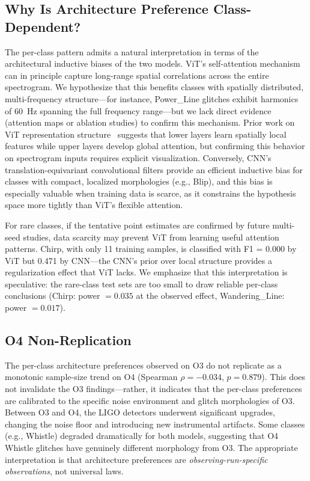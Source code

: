 \documentclass[12pt]{article}
\newcommand{\spearmanRhoOfour}{-0.034}
\newcommand{\spearmanPOfour}{0.879}
\begin{document}
\subsection{Why Is Architecture Preference Class-Dependent?}

The per-class pattern admits a natural interpretation in terms of the
architectural inductive biases of the two models.
ViT's self-attention mechanism can in principle capture long-range spatial
correlations across the entire spectrogram. We hypothesize that this benefits
classes with spatially distributed, multi-frequency structure---for instance,
Power\_Line glitches exhibit harmonics of 60~Hz spanning the full frequency
range---but we lack direct evidence (attention maps or ablation studies) to
confirm this mechanism.
Prior work on ViT representation structure~\citep{Raghu2021} suggests that
lower layers learn spatially local features while upper layers develop global
attention, but confirming this behavior on spectrogram inputs requires
explicit visualization.
Conversely, CNN's translation-equivariant convolutional filters provide an
efficient inductive bias for classes with compact, localized morphologies
(e.g., Blip), and this bias is especially valuable when training data is
scarce, as it constrains the hypothesis space more tightly than
ViT's flexible attention.

For rare classes, if the tentative point estimates are confirmed by future multi-seed studies, data scarcity may prevent ViT from learning useful attention patterns.
Chirp, with only 11 training samples, is classified with F1 = 0.000 by ViT
but 0.471 by CNN---the CNN's prior over local structure provides a
regularization effect that ViT lacks.
We emphasize that this interpretation is speculative: the rare-class test sets
are too small to draw reliable per-class conclusions
(Chirp: power $= 0.035$ at the observed effect,
Wandering\_Line: power $= 0.017$).

\subsection{O4 Non-Replication}

The per-class architecture preferences observed on O3 do not replicate as a
monotonic sample-size trend on O4 (Spearman $\rho = \spearmanRhoOfour$,
$p = \spearmanPOfour$).
This does not invalidate the O3 findings---rather, it indicates that the
per-class preferences are calibrated to the specific noise environment and
glitch morphologies of O3.
Between O3 and O4, the LIGO detectors underwent significant upgrades,
changing the noise floor and introducing new instrumental artifacts.
Some classes (e.g., Whistle) degraded dramatically for both models, suggesting
that O4 Whistle glitches have genuinely different morphology from O3.
The appropriate interpretation is that architecture preferences are
\emph{observing-run-specific observations}, not universal laws.
\end{document}
